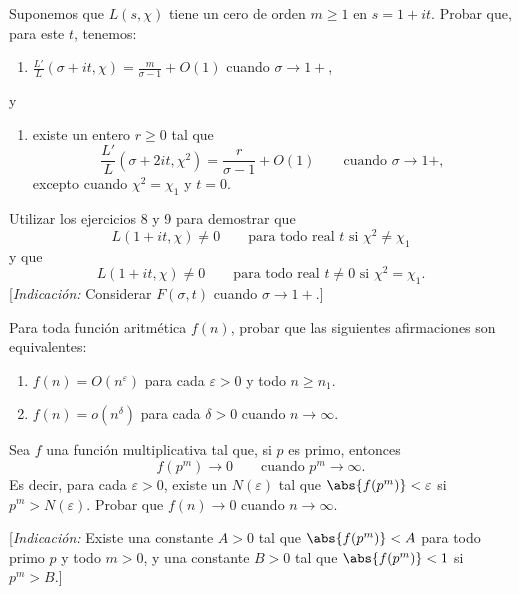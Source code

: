     \begin{ejercicio}
        Suponemos que $L(s,\chi)$ tiene un cero de orden $m\geq1$ en $s=1+it$. Probar que, para
        este $t$, tenemos:
        \begin{enumerate}
            \item[(a)] $\displaystyle\frac{L'}{L}(\sigma+it,\chi)=\frac{m}{\sigma-1}+O(1)$ cuando $\sigma\to1+$,
        \end{enumerate}
        y
        \begin{enumerate}
            \item[(b)] existe un entero $r\geq0$ tal que
            \begin{equation*}
                \frac{L'}{L}(\sigma+2it,\chi^2)=\frac{r}{\sigma-1}+O(1)\qquad\text{cuando }\sigma\to1+,
            \end{equation*}
            excepto cuando $\chi^2=\chi_1$ y $t=0$.
        \end{enumerate}
    \end{ejercicio}

    \begin{ejercicio}
        Utilizar los ejercicios 8 y 9 para demostrar que
        \begin{equation*}
            L(1+it,\chi)\neq0\qquad\text{para todo real }t\text{ si }\chi^2\neq\chi_1
        \end{equation*}
        y que
        \begin{equation*}
            L(1+it,\chi)\neq0\qquad\text{para todo real }t\neq0\text{ si }\chi^2=\chi_1.
        \end{equation*}
        [\textit{Indicación:} Considerar $F(\sigma,t)$ cuando $\sigma\to1+$.]
    \end{ejercicio}

    \begin{ejercicio}
        Para toda función aritmética $f(n)$, probar que las siguientes afirmaciones son
        equivalentes:
        \begin{enumerate}
            \item[(a)] $f(n)=O(n^{\varepsilon})$ para cada $\varepsilon>0$ y todo
            $n\geq n_1$.
            \item[(b)] $f(n)=o(n^{\delta})$ para cada $\delta>0$ cuando $n\to\infty$.
        \end{enumerate}
    \end{ejercicio}

    \begin{ejercicio}
        Sea $f$ una función multiplicativa tal que, si $p$ es primo, entonces
        \begin{equation*}
            f(p^m)\to0\qquad\text{cuando }p^m\to\infty.
        \end{equation*}
        Es decir, para cada $\varepsilon>0$, existe un $N(\varepsilon)$ tal que
        $\abs{f(p^m)}<\varepsilon$ si $p^m>N(\varepsilon)$. Probar que $f(n)\to0$ cuando
        $n\to\infty$.

        [\textit{Indicación:} Existe una constante $A>0$ tal que $\abs{f(p^m)}<A$ para todo
        primo $p$ y todo $m>0$, y una constante $B>0$ tal que $\abs{f(p^m)}<1$ si $p^m>B$.]
    \end{ejercicio}

